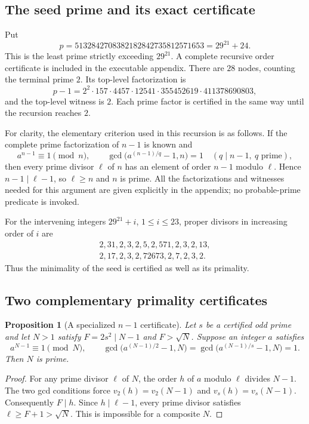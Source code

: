 \documentclass[11pt,a4paper]{article}
\newtheorem{proposition}[theorem]{Proposition}
\theoremstyle{definition}
\theoremstyle{remark}
\numberwithin{equation}{section}
\begin{document}
\subsection{The seed prime and its exact certificate}

Put
\begin{equation}\label{enc:eq:certificate-seed}
p=5132842708382182842735812571653=29^{21}+24.
\end{equation}
This is the least prime strictly exceeding $29^{21}$.  A complete recursive
order certificate is included in the executable appendix.  There are
$28$ nodes, counting the terminal prime $2$.  Its top-level factorization is
\[
p-1=2^2\cdot157\cdot4457\cdot12541\cdot355452619
       \cdot411378690803,
\]
and the top-level witness is $2$.  Each prime factor is certified in the
same way until the recursion reaches $2$.

For clarity, the elementary criterion used in this recursion is as follows.
If the complete prime factorization of $n-1$ is known and
\[
a^{n-1}\equiv1\pmod n,\qquad
\gcd\bigl(a^{(n-1)/q}-1,n\bigr)=1
\quad(q\mid n-1,\ q\text{ prime}),
\]
then every prime divisor $\ell$ of $n$ has an element of order $n-1$
modulo $\ell$.  Hence $n-1\mid\ell-1$, so $\ell\ge n$ and $n$ is prime.
All the factorizations and witnesses needed for this argument are given
explicitly in the appendix; no probable-prime predicate is invoked.

For the intervening integers $29^{21}+i$, $1\le i\le23$, proper divisors
in increasing order of $i$ are
\[
\begin{gathered}
2,31,2,3,2,5,2,571,2,3,2,13,\\
2,17,2,3,2,72673,2,7,2,3,2.
\end{gathered}
\]
Thus the minimality of the seed is certified as well as its primality.

\subsection{Two complementary primality certificates}

\begin{proposition}[A specialized $n-1$ certificate]
\label{enc:prop:plus-certificate}
Let $s$ be a certified odd prime and let $N>1$ satisfy
$F=2s^2\mid N-1$ and $F>\sqrt N$.  Suppose an integer $a$ satisfies
\begin{equation}\label{enc:eq:plus-certificate}
a^{N-1}\equiv1\pmod N,\qquad
\gcd\bigl(a^{(N-1)/2}-1,N\bigr)
=\gcd\bigl(a^{(N-1)/s}-1,N\bigr)=1.
\end{equation}
Then $N$ is prime.
\end{proposition}
\begin{proof}
For any prime divisor $\ell$ of $N$, the order $h$ of $a$ modulo $\ell$
divides $N-1$.  The two gcd conditions force
$v_2(h)=v_2(N-1)$ and $v_s(h)=v_s(N-1)$.  Consequently $F\mid h$.
Since $h\mid\ell-1$, every prime divisor satisfies
$\ell\ge F+1>\sqrt N$.  This is impossible for a composite $N$.
\end{proof}
\end{document}
